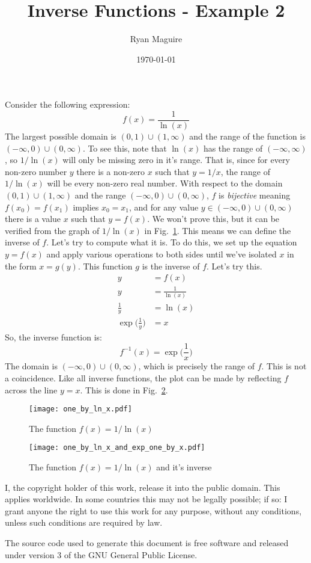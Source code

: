 \documentclass{article}
\title{Inverse Functions - Example 2}
\author{Ryan Maguire}
\date{\today}
\begin{document}
    \maketitle
    Consider the following expression:
    \begin{equation}
        f(x)=\frac{1}{\ln(x)}
    \end{equation}
    The largest possible domain is $(0,1)\cup(1,\infty)$ and the range of the
    function is $(-\infty,0)\cup(0,\infty)$. To see this, note that
    $\ln(x)$ has the range of $(-\infty,\infty)$, so $1/\ln(x)$ will only be
    missing zero in it's range. That is, since for every non-zero number $y$
    there is a non-zero $x$ such that $y=1/x$, the range of $1/\ln(x)$ will be
    every non-zero real number. With respect to the domain
    $(0,1)\cup(1,\infty)$ and the range $(-\infty,0)\cup(0,\infty)$, $f$ is
    \textit{bijective} meaning $f(x_0)=f(x_{1})$ implies $x_{0}=x_{1}$,
    and for any value $y\in(-\infty,0)\cup(0,\infty)$ there is a value $x$
    such that $y=f(x)$. We won't prove this, but it can be verified from the
    graph of $1/\ln(x)$ in Fig.~\ref{fig:one_by_ln_x}. This means we can define
    the inverse of $f$. Let's try to compute what it is. To do this, we set up
    the equation $y=f(x)$ and apply various operations to both sides until
    we've isolated $x$ in the form $x=g(y)$. This function $g$ is the inverse
    of $f$. Let's try this.
    \begin{align}
        y&=f(x)\\
        y&=\frac{1}{\ln(x)}\\
        \frac{1}{y}&=\ln(x)\\
        \exp\big(\frac{1}{y}\big)&=x
    \end{align}
    So, the inverse function is:
    \begin{equation}
        f^{-1}(x)=\exp\big(\frac{1}{x}\big)
    \end{equation}
    The domain is $(-\infty,0)\cup(0,\infty)$, which is precisely the range of
    $f$. This is not a coincidence. Like all inverse functions, the plot can
    be made by reflecting $f$ across the line $y=x$. This is done in
    Fig.~\ref{fig:one_by_ln_x_and_inverse}.
    \begin{figure}
        \centering
        \texttt{[image: one\_by\_ln\_x.pdf]}
        \caption{The function $f(x)=1/\ln(x)$}
        \label{fig:one_by_ln_x}
    \end{figure}
    \begin{figure}
        \centering
        \texttt{[image: one\_by\_ln\_x\_and\_exp\_one\_by\_x.pdf]}
        \caption{The function $f(x)=1/\ln(x)$ and it's inverse}
        \label{fig:one_by_ln_x_and_inverse}
    \end{figure}
    \newpage
    I, the copyright holder of this work, release it into the public domain.
    This applies worldwide. In some countries this may not be legally possible;
    if so: I grant anyone the right to use this work for any purpose, without
    any conditions, unless such conditions are required by law.
    \par\hfill\par
    The source code used to generate this document is free software and released
    under version 3 of the GNU General Public License.
\end{document}
